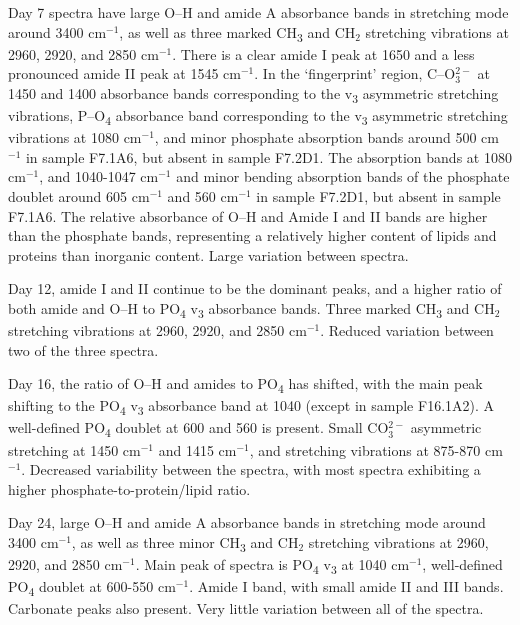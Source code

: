 \documentclass[
]{article}
\begin{document}
Day 7 spectra have large O--H and amide A absorbance bands in stretching
mode around 3400 cm\(^{-1}\), as well as three marked
CH\textsubscript{3} and CH\(_2\) stretching vibrations at 2960, 2920,
and 2850 cm\(^{-1}\). There is a clear amide I peak at 1650 and a less
pronounced amide II peak at 1545 cm\(^{-1}\). In the `fingerprint'
region, C--O\(_3^{2-}\) at 1450 and 1400 absorbance bands corresponding
to the v\textsubscript{3} asymmetric stretching vibrations,
P--O\textsubscript{4} absorbance band corresponding to the
v\textsubscript{3} asymmetric stretching vibrations at 1080 cm\(^{-1}\),
and minor phosphate absorption bands around 500 cm\(^{-1}\) in sample
F7.1A6, but absent in sample F7.2D1. The absorption bands at 1080
cm\(^{-1}\), and 1040-1047 cm\(^{-1}\) and minor bending absorption
bands of the phosphate doublet around 605 cm\(^{-1}\) and 560
cm\(^{-1}\) in sample F7.2D1, but absent in sample F7.1A6. The relative
absorbance of O--H and Amide I and II bands are higher than the
phosphate bands, representing a relatively higher content of lipids and
proteins than inorganic content. Large variation between spectra.

Day 12, amide I and II continue to be the dominant peaks, and a higher
ratio of both amide and O--H to PO\textsubscript{4} v\textsubscript{3}
absorbance bands. Three marked CH\textsubscript{3} and CH\(_2\)
stretching vibrations at 2960, 2920, and 2850 cm\(^{-1}\). Reduced
variation between two of the three spectra.

Day 16, the ratio of O--H and amides to PO\textsubscript{4} has shifted,
with the main peak shifting to the PO\textsubscript{4}
v\textsubscript{3} absorbance band at 1040 (except in sample F16.1A2). A
well-defined PO\textsubscript{4} doublet at 600 and 560 is present.
Small CO\(_3^{2-}\) asymmetric stretching at 1450 cm\(^{-1}\) and 1415
cm\(^{-1}\), and stretching vibrations at 875-870 cm\(^{-1}\). Decreased
variability between the spectra, with most spectra exhibiting a higher
phosphate-to-protein/lipid ratio.

Day 24, large O--H and amide A absorbance bands in stretching mode
around 3400 cm\(^{-1}\), as well as three minor CH\textsubscript{3} and
CH\(_2\) stretching vibrations at 2960, 2920, and 2850 cm\(^{-1}\). Main
peak of spectra is PO\textsubscript{4} v\textsubscript{3} at 1040
cm\(^{-1}\), well-defined PO\textsubscript{4} doublet at 600-550
cm\(^{-1}\). Amide I band, with small amide II and III bands. Carbonate
peaks also present. Very little variation between all of the spectra.
\end{document}

